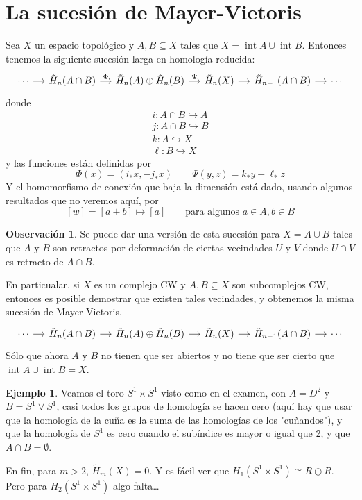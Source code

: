 \documentclass[spanish]{book}
\theoremstyle{definition}
\newtheorem*{obs}{Observación}
\newtheorem*{ejem}{Ejemplo}
\DeclareMathOperator{\Int}{int}
\begin{document}
\section{La sucesión de Mayer-Vietoris}
	Sea $X$ un espacio topológico y $A,B\subseteq X$ tales que $X=\Int A\cup \Int B$. Entonces tenemos la siguiente sucesión larga en homología reducida:
	\[\begin{tikzcd}[column sep= small]
		\cdots \arrow[r] & \tilde{H}_n(A\cap B) \arrow[r,"\Phi"] & \tilde{H}_n(A) \oplus \tilde{H}_n(B) \arrow[r,"\Psi"] & \tilde{H}_n(X) \arrow[r] & \tilde{H}_{n-1}(A\cap B) \arrow[r] &\cdots
	\end{tikzcd}\]
	donde 
	\begin{align*}
		i:A\cap B\hookrightarrow A\\
		j:A\cap B\hookrightarrow B\\
		k:A\hookrightarrow X\\
		\ell:B\hookrightarrow X
	\end{align*}
	y las funciones están definidas por
	\[\Phi(x)=(i_*x,-j_*x)\qquad\Psi(y,z)=k_*y+\ell_*z \]
	Y el homomorfismo de conexión que baja la dimensión está dado, usando algunos resultados que no veremos aquí, por
	\[[w]=[a+b]\mapsto[a]\qquad\text{para algunos }a\in A,b\in B\]
\begin{obs}
	Se puede dar una versión de esta sucesión para $X=A\cup B$ tales que $A$ y $B$ son retractos por deformación de ciertas vecindades $U$ y $V$ donde $U\cap V$ es retracto de $A\cap B$.
	
	En particualar, si $X$ es un complejo CW y $A,B\subseteq X$ son subcomplejos CW, entonces es posible demostrar que existen tales vecindades, y obtenemos la misma sucesión de Mayer-Vietoris,
	\[\begin{tikzcd}[column sep= small]
		\cdots \arrow[r] & \tilde{H}_n(A\cap B) \arrow[r] & \tilde{H}_n(A) \oplus \tilde{H}_n(B) \arrow[r] & \tilde{H}_n(X) \arrow[r] & \tilde{H}_{n-1}(A\cap B) \arrow[r] &\cdots
	\end{tikzcd}\]
	Sólo que ahora $A$ y $B$ no tienen que ser abiertos y no tiene que ser cierto que $\Int A\cup\Int B=X$.
\end{obs}
\begin{ejem}
	Veamos el toro $S^1\times S^1$ visto como en el examen, con $A=D^2$ y $B=S^1\vee S^1$, casi todos los grupos de homología se hacen cero (aquí hay que usar que la homología de la cuña es la suma de las homologías de los "cuñandos"), y que la homología de $S^1$ es cero cuando el subíndice es mayor o igual que 2, y que $A\cap B=\emptyset$.
	
	En fin, para $m>2$, $\tilde H_m(X)=0$. Y es fácil ver que $H_1(S^1\times S^1)\cong R\oplus R$. Pero para $H_2(S^1\times S^1)$ algo falta…

\end{ejem}
\end{document}
